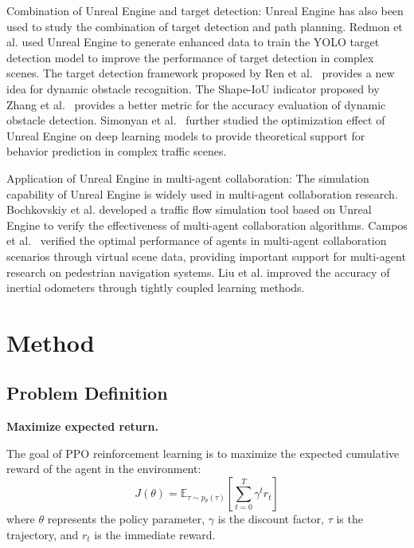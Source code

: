 \documentclass[lettersize,journal]{IEEEtran}
\begin{document}
Combination of Unreal Engine and target detection: 
Unreal Engine has also been used to study the combination of target detection and path planning. 
Redmon et al. \cite{redmon2017yolo9000} used Unreal Engine to generate enhanced data to train the YOLO target detection model to improve the performance of target detection in complex scenes. 
The target detection framework proposed by Ren et al.~\cite{ren2016faster} provides a new idea for dynamic obstacle recognition. 
The Shape-IoU indicator proposed by Zhang et al.~\cite{zhang2023shape} provides a better metric for the accuracy evaluation of dynamic obstacle detection. 
Simonyan et al.~\cite{simonyan2014two} further studied the optimization effect of Unreal Engine on deep learning models to provide theoretical support for behavior prediction in complex traffic scenes.


Application of Unreal Engine in multi-agent collaboration: 
The simulation capability of Unreal Engine is widely used in multi-agent collaboration research. 
Bochkovskiy et al.\cite{bochkovskiy2020yolov4} developed a traffic flow simulation tool based on Unreal Engine to verify the effectiveness of multi-agent collaboration algorithms. 
Campos et al.~\cite{campos2021orb} verified the optimal performance of agents in multi-agent collaboration scenarios through virtual scene data, providing important support for multi-agent research on pedestrian navigation systems. 
Liu et al.\cite{liu2020tlio} improved the accuracy of inertial odometers through tightly coupled learning methods.




\section{Method}

\subsection{Problem Definition}


\textbf{Maximize expected return.}

The goal of PPO reinforcement learning is to maximize the expected cumulative reward of the agent in the environment:
\begin{equation}
	J(\theta) = \mathbb{E}_{\tau \sim p_{\theta}(\tau)} \left[ \sum_{t=0}^{T} \gamma^t r_t \right]
\end{equation}
where $\theta$ represents the policy parameter, 
$\gamma$ is the discount factor, 
$\tau$ is the trajectory, and $r_t$ is the immediate reward.
\end{document}
